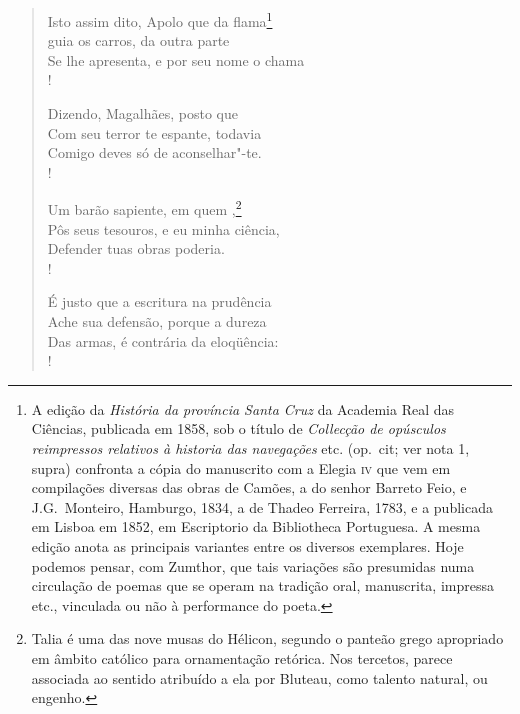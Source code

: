 \begin{verse}
Isto assim dito, Apolo que da flama\footnote{ A edição da \textit{História da
província Santa Cruz} da Academia Real das Ciências, publicada em 1858,
sob o título de \textit{Collecção de opúsculos reimpressos relativos à historia
das navegações} etc. (op.~cit; ver nota 1, supra) confronta a cópia do
manuscrito com a Elegia \textsc{iv} que vem em compilações diversas das obras de
Camões, a do senhor Barreto Feio, e J.G.~Monteiro, Hamburgo, 1834, a de
Thadeo Ferreira, 1783, e a publicada em Lisboa em 1852, em Escriptorio
da Bibliotheca Portuguesa. A mesma edição anota as principais variantes
entre os diversos exemplares. Hoje podemos pensar, com Zumthor, que
tais variações são presumidas numa circulação de poemas que se operam
na tradição oral, manuscrita, impressa etc., vinculada ou não à performance do poeta.}\\
 guia os carros, da outra parte\\  
Se lhe apresenta, e por seu nome o chama\\!

Dizendo, Magalhães, posto que \\  			%
Com seu terror te espante, todavia\\
Comigo deves só de aconselhar"-te.\\!

Um barão sapiente, em quem ,\footnote{ Talia é uma das nove musas do
Hélicon, segundo o panteão grego apropriado em âmbito católico para
ornamentação retórica. Nos tercetos, parece associada ao sentido
atribuído a ela por Bluteau, como talento natural, ou engenho.}\\
Pôs seus tesouros, e eu minha ciência,\\
Defender tuas obras poderia.\\!

É justo que a escritura na prudência\\
Ache sua defensão, porque a dureza\\
Das armas, é contrária da eloqüência:\\!


\end{verse}
